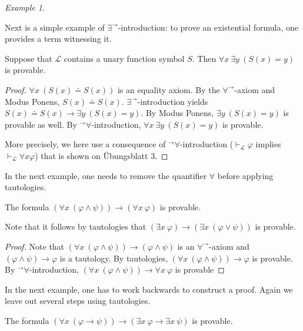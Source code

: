 \documentclass[a4paper, 11pt]{amsart}
\theoremstyle{remark}
\newtheorem{example}[example]{Example}
\newcommand{\cL}{\mathcal L}
\newenvironment{enumerate-(1)}{\begin{enumerate}[label={\upshape (\arabic*)}, leftmargin=2pc]}{\end{enumerate}}
\begin{document}
\begin{example}
\begin{enumerate-(1)}

\item 
Next is a simple example of $\exists^\rightarrow$-introduction: to prove an existential formula, one provides a term witnessing it. 

Suppose that $\cL$ contains a unary function symbol $S$. 
Then $\forall x\ \exists y\ (S(x)=y)$ is provable. 

\begin{proof} 
$\forall x\ (S(x)\doteq S(x))$ is an equality axiom. 
By the $\forall^\rightarrow$-axiom and Modus Ponens, $S(x)\doteq S(x)$. 
$\exists^\rightarrow$-introduction yields 
$S(x)\doteq S(x)  \rightarrow  \exists y\ (S(x)=y)$. 
By Modus Ponens, $ \exists y\ (S(x)=y)$ is provable as well. 
By ${}^\rightarrow\forall$-introduction, $\forall x\ \exists y\ (S(x)=y)$ is provable. 

More precisely, we here use a consequence of ${}^\rightarrow\forall$-introduction ($\vdash_\cL \varphi$ implies $\vdash_\cL \forall x \varphi$) that is shown on \"Ubungsblatt 3. 


\end{proof} 

\item 
In the next example, one needs to remove the quantifier $\forall$ before applying tautologies. 

The formula $(\forall x\ (\varphi \wedge \psi)) \rightarrow (\forall x\ \varphi) $ is provable. 

Note that it follows by tautologies that $ (\exists x\ \varphi)  \rightarrow (\exists x\ (\varphi \vee \psi))$ is provable. 

\begin{proof} 
Note that $(\forall x\ (\varphi \wedge \psi)) \rightarrow (\varphi \wedge \psi) $ is an $\forall^\rightarrow$-axiom and $(\varphi\wedge \psi) \rightarrow \varphi$ is a tautology. 
By tautologies, $(\forall x\ (\varphi \wedge \psi)) \rightarrow \varphi$ is provable. 
By ${}^\rightarrow\forall$-introduction, $(\forall x\ (\varphi \wedge \psi)) \rightarrow \forall x\ \varphi$ is provable 
\end{proof} 

\item 
In the next example, one has to work backwards to construct a proof. 
Again we leave out several steps using tautologies. 

The formula $(\forall x\ (\varphi\rightarrow \psi)) \rightarrow  (\exists x\ \varphi  \rightarrow  \exists x\ \psi)$ is provable. 


\end{enumerate-(1)}
\end{example}
\end{document}
